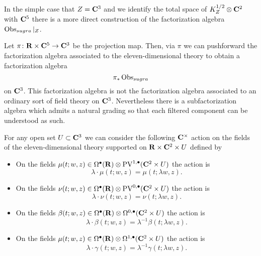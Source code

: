 \documentclass[11pt]{amsart}
\begin{document}
\parsec[s:flat]

%

In the simple case that $Z = \mathbf{C}^3$ and we identify the total space of $K^{1/2}_Z \otimes \mathbf{C}^2$ with $\mathbf{C}^5$ there is a more direct construction of the factorization algebra $\operatorname{Obs}_{sugra}|_{Z}$. 

Let $\pi \colon \mathbf{R} \times \mathbf{C}^5 \to \mathbf{C}^3$ be the projection map.
Then, via $\pi$ we can pushforward the factorization algebra associated to the eleven-dimensional theory to obtain a factorization algebra
\[
\pi_* \operatorname{Obs}_{sugra} 
\]
on $\mathbf{C}^3$.
This factorization algebra is not the factorization algebra associated to an ordinary sort of field theory on $\mathbf{C}^3$. 
Nevertheless there is a subfactorization algebra which admits a natural grading so that each filtered component can be understood as such.

For any open set $U \subset \mathbf{C}^3$ we can consider the following $\mathbf{C}^\times$ action on the fields of the eleven-dimensional theory supported on $\mathbf{R} \times \mathbf{C}^2 \times U$ defined by
\begin{itemize}
\item On the fields $\mu(t;w,z) \in \Omega^\bullet(\mathbf{R}) \otimes {\rm PV}^{1,\bullet}(\mathbf{C}^2 \times U)$ the action is
\[
\lambda \cdot \mu(t;w,z) = \mu(t;\lambda w , z).
\]
\item On the fields $\nu(t;w,z) \in \Omega^\bullet(\mathbf{R}) \otimes {\rm PV}^{0,\bullet}(\mathbf{C}^2 \times U)$ the action is
\[
\lambda \cdot \nu(t;w,z) = \nu(t;\lambda w , z).
\]
\item On the fields $\beta(t;w,z) \in \Omega^\bullet(\mathbf{R}) \otimes \Omega^{0,\bullet}(\mathbf{C}^2 \times U)$ the action is
\[
\lambda \cdot \beta(t;w,z) = \lambda^{-1} \beta(t;\lambda w , z).
\]
\item On the fields $\mu(t;w,z) \in \Omega^\bullet(\mathbf{R}) \otimes \Omega^{1,\bullet}(\mathbf{C}^2 \times U)$ the action is
\[
\lambda \cdot \gamma(t;w,z) = \lambda^{-1} \gamma(t;\lambda w , z).
\]
\end{itemize}
\end{document}
